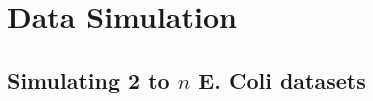 \documentclass{bmcart}
\begin{document}



\section*{Data Simulation}
\subsection*{Simulating 2 to $n$ E. Coli datasets}
\end{document}

